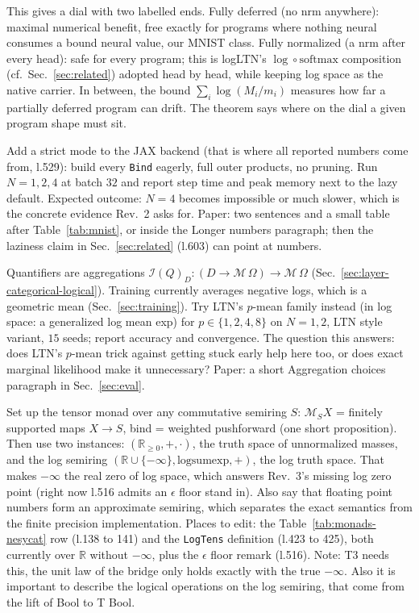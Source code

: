 \documentclass[anon]{../../journal-templates/NeSy26/nesy2026} %
\begin{document}
\begin{description}
This gives a dial with two labelled ends. Fully deferred (no
$\mathrm{nrm}$ anywhere): maximal numerical benefit, free exactly for
programs where nothing neural consumes a bound neural value, our MNIST
class. Fully normalized (a $\mathrm{nrm}$ after every head): safe for
every program; this is logLTN's $\log \circ \mathrm{softmax}$ composition
(cf.\ Sec.~\ref{sec:related}) adopted head by head, while keeping log
space as the native carrier. In between, the bound
$\sum_i \log(M_i/m_i)$ measures how far a partially deferred program can
drift. The theorem says where on the dial a given program shape must sit.

\item[T4: ablation, remove lazy evaluation (Rev.~2).]
Add a strict mode to the JAX backend (that is where all reported numbers
come from, l.529): build every \texttt{Bind} eagerly, full outer products,
no pruning. Run $N=1,2,4$ at batch $32$ and report step time and peak
memory next to the lazy default. Expected outcome: $N=4$ becomes impossible
or much slower, which is the concrete evidence Rev.~2 asks for. Paper: two
sentences and a small table after Table~\ref{tab:mnist}, or inside the
Longer numbers paragraph; then the laziness claim in
Sec.~\ref{sec:related} (l.603) can point at numbers.

\item[T5: vary the quantifier aggregation $p$ (Rev.~2).]
Quantifiers are aggregations
$\mathcal I(Q)_D \colon (D\to\mathcal M\,\Omega)\to\mathcal M\,\Omega$
(Sec.~\ref{sec:layer-categorical-logical}). Training currently averages
negative logs, which is a geometric mean (Sec.~\ref{sec:training}). Try
LTN's $p$-mean family instead (in log space: a generalized log mean exp)
for $p \in \{1,2,4,8\}$ on $N=1,2$, LTN style variant, $15$ seeds; report
accuracy and convergence. The question this answers: does LTN's $p$-mean
trick against getting stuck early help here too, or does exact marginal
likelihood make it unnecessary? Paper: a short Aggregation choices
paragraph in Sec.~\ref{sec:eval}.

\item[T6: truth space $\mathbb R_{\ge 0}$, log truth space, semirings (Rev.~3).]
Set up the tensor monad over any commutative semiring $S$: $\mathcal M_S X$
= finitely supported maps $X \to S$, bind = weighted pushforward (one short
proposition). Then use two instances: $(\mathbb R_{\ge 0},+,\cdot)$, the
truth space of unnormalized masses, and the log semiring
$(\mathbb R\cup\{-\infty\},\mathrm{logsumexp},+)$, the log truth space.
That makes $-\infty$ the real zero of log space, which answers Rev.~3's
missing log zero point (right now l.516 admits an $\epsilon$ floor stand
in). Also say that floating point numbers form an approximate semiring,
which separates the exact semantics from the finite precision
implementation. Places to edit: the Table~\ref{tab:monads-nesycat} row
(l.138 to 141) and the \texttt{LogTens} definition (l.423 to 425), both
currently over $\mathbb R$ without $-\infty$, plus the $\epsilon$ floor
remark (l.516). Note: T3 needs this, the unit law of the bridge only holds
exactly with the true $-\infty$. Also it is important to describe the logical operations on the log semiring, that come from the lift of Bool to T Bool.


\end{description}
\end{document}
